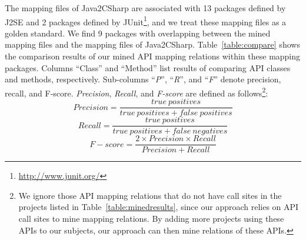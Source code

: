 The mapping files of Java2CSharp are associated with
13 packages defined by J2SE and 2 packages defined by
JUnit\footnote{\url{http://www.junit.org/}}, and we treat these
mapping files as a golden standard. We find 9 packages with overlapping
between the mined mapping files and the mapping files of
Java2CSharp. Table~\ref{table:compare} shows the comparison
results of our mined API mapping relations within these mapping packages.
Columns ``Class'' and ``Method'' list results of comparing API
classes and methods, respectively. Sub-columns
``\emph{P}'', ``\emph{R}'', and ``\emph{F}'' denote precision,
recall, and F-score. \emph{Precision}, \emph{Recall}, and \emph{F-score} are defined as
follows\footnote{We ignore those API mapping relations that do
not have call sites in the projects listed in
Table~\ref{table:minedresults}, since our approach relies on
API call sites to mine mapping relations. By adding
more projects using these APIs to our subjects, our approach can then
mine relations of these APIs.}:\vspace*{-1ex}
\begin{equation}\label{eq-precison}
Precision=\frac{true\ positives}{true\ positives+false\ positives}
\end{equation}\vspace*{-2ex}
\begin{equation}\label{eq-recall}
Recall=\frac{true\ positives}{true\ positives+false\ negatives}
\end{equation}\vspace*{-2ex}
\begin{equation}\label{eq-fscore}
F\!-\!score=\frac{2\times Precision \times Recall}{Precision+Recall}
\end{equation}\vspace*{-2ex}

